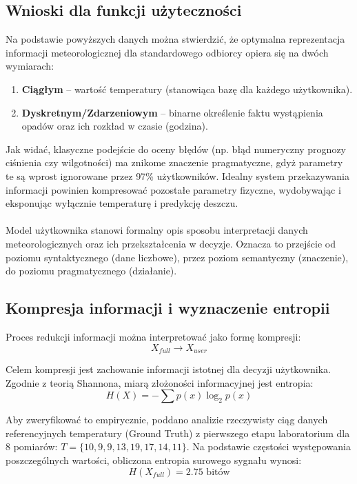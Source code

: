 \documentclass[a4paper,12pt]{article}
\begin{document}
\subsection{Wnioski dla funkcji użyteczności}

Na podstawie powyższych danych można stwierdzić, że optymalna reprezentacja informacji meteorologicznej dla standardowego odbiorcy opiera się na dwóch wymiarach:
\begin{enumerate}
    \item \textbf{Ciągłym} – wartość temperatury (stanowiąca bazę dla każdego użytkownika).
    \item \textbf{Dyskretnym/Zdarzeniowym} – binarne określenie faktu wystąpienia opadów oraz ich rozkład w czasie (godzina).
\end{enumerate}

Jak widać, klasyczne podejście do oceny błędów (np. błąd numeryczny prognozy ciśnienia czy wilgotności) ma znikome znaczenie pragmatyczne, gdyż parametry te są wprost ignorowane przez 97\% użytkowników. Idealny system przekazywania informacji powinien kompresować pozostałe parametry fizyczne, wydobywając i eksponując wyłącznie temperaturę i predykcję deszczu.
\paragraph{}
Model użytkownika stanowi formalny opis sposobu interpretacji danych
meteorologicznych oraz ich przekształcenia w decyzje. Oznacza to przejście od
poziomu syntaktycznego (dane liczbowe), przez poziom semantyczny (znaczenie),
do poziomu pragmatycznego (działanie).
\subsection{Kompresja informacji i wyznaczenie entropii}

Proces redukcji informacji można interpretować jako formę kompresji:
\[
X_{full} \rightarrow X_{user}
\]

Celem kompresji jest zachowanie informacji istotnej dla decyzji użytkownika. Zgodnie z teorią Shannona, miarą złożoności informacyjnej jest entropia:
\[
H(X) = - \sum p(x) \log_2 p(x)
\]

Aby zweryfikować to empirycznie, poddano analizie rzeczywisty ciąg danych referencyjnych temperatury (Ground Truth) z pierwszego etapu laboratorium dla 8 pomiarów: $T = \{10, 9, 9, 13, 19, 17, 14, 11\}$. 
Na podstawie częstości występowania poszczególnych wartości, obliczona entropia surowego sygnału wynosi:
\[
H(X_{full}) = 2.75 \text{ bitów}
\]
\end{document}
